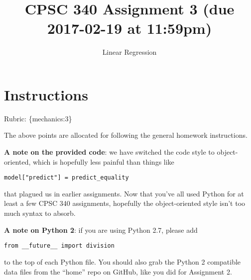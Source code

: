 \documentclass{article}
\begin{document}
\def\blu#1{{\color{blu}#1}}
\def\gre#1{{\color{gre}#1}}
\def\red#1{{\color{red}#1}}
\def\norm#1{\|#1\|}
\newcommand{\argmin}[1]{\mathop{\hbox{argmin}}_{#1}}
\newcommand{\argmax}[1]{\mathop{\hbox{argmax}}_{#1}}
\def\R{\mathbb{R}}
\newcommand{\fig}[2]{\texttt{[image: \#2]}}
\newcommand{\centerfig}[2]{\begin{center}\texttt{[image: \#2]}\end{center}}
\def\items#1{\begin{itemize}#1\end{itemize}}
\def\enum#1{\begin{enumerate}#1\end{enumerate}}
\newcommand{\code}[1]{}
\newcommand{\half}{\frac 1 2}
\def\argmax{\mathop{\rm arg\,max}}
\def\argmin{\mathop{\rm arg\,min}}
\def\rubric#1{\gre{Rubric: \{#1\}}}{}


\title{CPSC 340 Assignment 3 (due 2017-02-19 at 11:59pm)}
\author{Linear Regression}
\date{}
\maketitle

\section*{Instructions}
\rubric{mechanics:3}

The above points are allocated for following the general homework instructions.

\vspace{1em}

\textbf{A note on the provided code}: we have switched the code style to object-oriented,
which is hopefully less painful than things like
\begin{verbatim}
model["predict"] = predict_equality
\end{verbatim}
that plagued us in earlier assignments. Now that you've all used Python for at least
a few CPSC 340 assignments, hopefully the object-oriented style isn't too much syntax to absorb.

\textbf{A note on Python 2}: if you are using Python 2.7, please add 
\begin{verbatim}
from __future__ import division
\end{verbatim}
to the top of each Python file. You should also grab the Python 2 compatible data files from the ``home'' repo on GitHub, like you did for Assignment 2.
\end{document}
